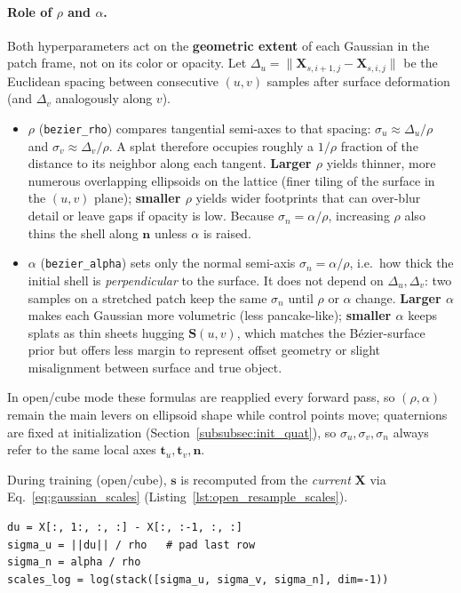 \documentclass{report}
\newcommand{\code}[1]{\nolinkurl{#1}}
\begin{document}
\paragraph{Role of $\rho$ and $\alpha$.}
Both hyperparameters act on the \textbf{geometric extent} of each Gaussian in the patch frame, not on its color or opacity. Let $\Delta_u=\|\mathbf{X}_{s,i+1,j}-\mathbf{X}_{s,i,j}\|$ be the Euclidean spacing between consecutive $(u,v)$ samples after surface deformation (and $\Delta_v$ analogously along $v$).
\begin{itemize}
    \item $\rho$ (\texttt{bezier\_rho}) compares tangential semi-axes to that spacing: $\sigma_u\approx \Delta_u/\rho$ and $\sigma_v\approx \Delta_v/\rho$. A splat therefore occupies roughly a $1/\rho$ fraction of the distance to its neighbor along each tangent. \textbf{Larger $\rho$} yields thinner, more numerous overlapping ellipsoids on the lattice (finer tiling of the surface in the $(u,v)$ plane); \textbf{smaller $\rho$} yields wider footprints that can over-blur detail or leave gaps if opacity is low. Because $\sigma_n=\alpha/\rho$, increasing $\rho$ also thins the shell along $\mathbf{n}$ unless $\alpha$ is raised.
    \item $\alpha$ (\texttt{bezier\_alpha}) sets only the normal semi-axis $\sigma_n=\alpha/\rho$, i.e.\ how thick the initial shell is \emph{perpendicular} to the surface. It does not depend on $\Delta_u,\Delta_v$: two samples on a stretched patch keep the same $\sigma_n$ until $\rho$ or $\alpha$ change. \textbf{Larger $\alpha$} makes each Gaussian more volumetric (less pancake-like); \textbf{smaller $\alpha$} keeps splats as thin sheets hugging $\mathbf{S}(u,v)$, which matches the B\'ezier-surface prior but offers less margin to represent offset geometry or slight misalignment between surface and true object.
\end{itemize}
In open/cube mode these formulas are reapplied every forward pass, so $(\rho,\alpha)$ remain the main levers on ellipsoid shape while control points move; quaternions are fixed at initialization (Section~\ref{subsubsec:init_quat}), so $\sigma_u,\sigma_v,\sigma_n$ always refer to the same local axes $\mathbf{t}_u,\mathbf{t}_v,\mathbf{n}$.

During training (open/cube), $\mathbf{s}$ is recomputed from the \emph{current} $\mathbf{X}$ via Eq.~\eqref{eq:gaussian_scales} (Listing~\ref{lst:open_resample_scales}).

\begin{lstlisting}[caption={Log-scale recomputation in \code{\_bezier\_open\_resample\_means\_scales}.},label={lst:open_resample_scales}]
du = X[:, 1:, :, :] - X[:, :-1, :, :]
sigma_u = ||du|| / rho   # pad last row
sigma_n = alpha / rho
scales_log = log(stack([sigma_u, sigma_v, sigma_n], dim=-1))
\end{lstlisting}
\end{document}
